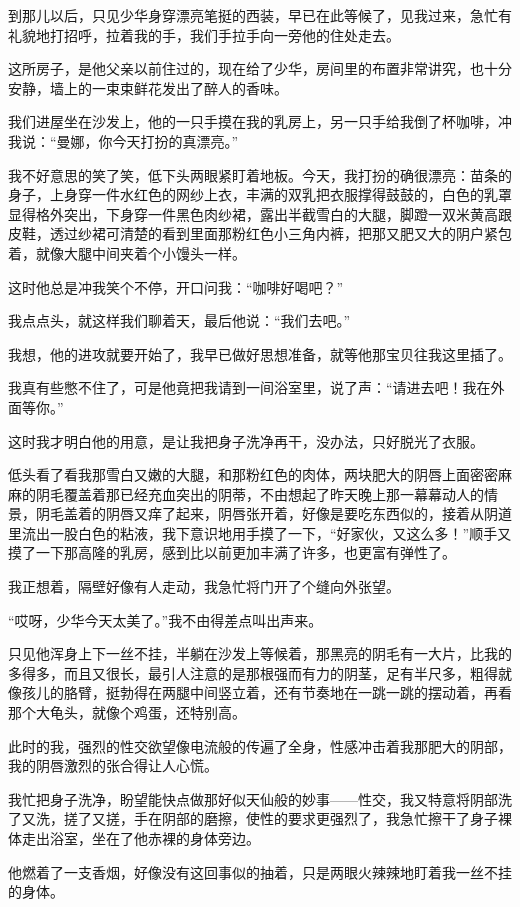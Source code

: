 \documentclass[12pt,UTF8]{ctexbook}
\begin{document}
到那儿以后，只见少华身穿漂亮笔挺的西装，早已在此等候了，见我过来，急忙有礼貌地打招呼，拉着我的手，我们手拉手向一旁他的住处走去。

这所房子，是他父亲以前住过的，现在给了少华，房间里的布置非常讲究，也十分安静，墙上的一束束鲜花发出了醉人的香味。

我们进屋坐在沙发上，他的一只手摸在我的乳房上，另一只手给我倒了杯咖啡，冲我说：“曼娜，你今天打扮的真漂亮。”

我不好意思的笑了笑，低下头两眼紧盯着地板。今天，我打扮的确很漂亮：苗条的身子，上身穿一件水红色的网纱上衣，丰满的双乳把衣服撑得鼓鼓的，白色的乳罩显得格外突出，下身穿一件黑色肉纱裙，露出半截雪白的大腿，脚蹬一双米黄高跟皮鞋，透过纱裙可清楚的看到里面那粉红色小三角内裤，把那又肥又大的阴户紧包着，就像大腿中间夹着个小馒头一样。

这时他总是冲我笑个不停，开口问我：“咖啡好喝吧？”

我点点头，就这样我们聊着天，最后他说：“我们去吧。”

我想，他的进攻就要开始了，我早已做好思想准备，就等他那宝贝往我这里插了。

我真有些憋不住了，可是他竟把我请到一间浴室里，说了声：“请进去吧！我在外面等你。”

这时我才明白他的用意，是让我把身子洗净再干，没办法，只好脱光了衣服。

低头看了看我那雪白又嫩的大腿，和那粉红色的肉体，两块肥大的阴唇上面密密麻麻的阴毛覆盖着那已经充血突出的阴蒂，不由想起了昨天晚上那一幕幕动人的情景，阴毛盖着的阴唇又痒了起来，阴唇张开着，好像是要吃东西似的，接着从阴道里流出一股白色的粘液，我下意识地用手摸了一下，“好家伙，又这么多！”顺手又摸了一下那高隆的乳房，感到比以前更加丰满了许多，也更富有弹性了。

我正想着，隔壁好像有人走动，我急忙将门开了个缝向外张望。

“哎呀，少华今天太美了。”我不由得差点叫出声来。

只见他浑身上下一丝不挂，半躺在沙发上等候着，那黑亮的阴毛有一大片，比我的多得多，而且又很长，最引人注意的是那根强而有力的阴茎，足有半尺多，粗得就像孩儿的胳臂，挺勃得在两腿中间竖立着，还有节奏地在一跳一跳的摆动着，再看那个大龟头，就像个鸡蛋，还特别高。

此时的我，强烈的性交欲望像电流般的传遍了全身，性感冲击着我那肥大的阴部，我的阴唇激烈的张合得让人心慌。

我忙把身子洗净，盼望能快点做那好似天仙般的妙事——性交，我又特意将阴部洗了又洗，搓了又搓，手在阴部的磨擦，使性的要求更强烈了，我急忙擦干了身子裸体走出浴室，坐在了他赤裸的身体旁边。

他燃着了一支香烟，好像没有这回事似的抽着，只是两眼火辣辣地盯着我一丝不挂的身体。
\end{document}
